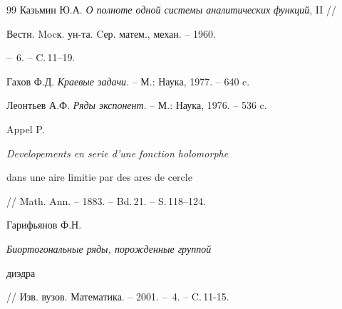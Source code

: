 \begin{thebibliography}{99}
Казьмин Ю.А. {\em О полноте одной системы аналитических функций}, II //  


Вестн. Mocк. ун-та. Cер. матем., механ. -- 1960. 


-- \No\,6. -- C.\,11--19. 




Гахов Ф.Д. {\em Краевые задачи}. -- М.: Наука, 1977. -- 640 c. 




Леонтьев А.Ф. {\em Ряды экспонент}. -- М.: Наука, 1976. -- 536 c. 




Appel P. {\em Developements en serie d'une fonction holomorphe 


dans une aire limitie par des ares de cercle} 


// Math. Ann. -- 1883. -- Bd.\,21. -- S.\,118--124. 




Гарифьянов Ф.Н. {\em Биортогональные ряды, порожденные группой 


диэдра} // Изв. вузов. Математика. -- 2001. -- \No\,4. -- C.\,11-15. 


 


\end{thebibliography} 


 


\vskip 2cm 


 








 


\label{end} 


 


 


